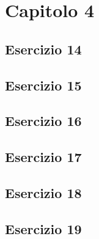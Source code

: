 \section{\textbf{Capitolo 4}}
\subsection{Esercizio 14}

\subsection{Esercizio 15}

\subsection{Esercizio 16}

\subsection{Esercizio 17}

\subsection{Esercizio 18}

\subsection{Esercizio 19}

